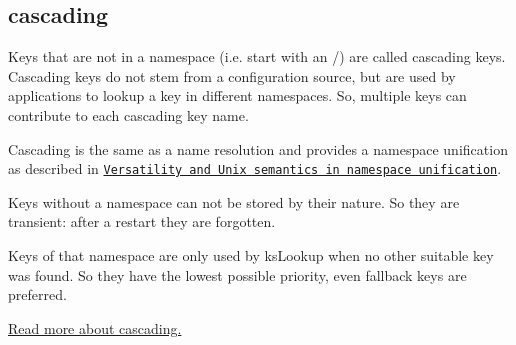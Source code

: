 \subsection*{cascading}

Keys that are not in a namespace (i.\+e. start with an {\ttfamily /}) are called cascading keys. Cascading keys do not stem from a configuration source, but are used by applications to lookup a key in different namespaces. So, multiple keys can contribute to each cascading key name.

Cascading is the same as a name resolution and provides a namespace unification as described in \href{http://dl.acm.org/citation.cfm?id=1138045}{\tt Versatility and Unix semantics in namespace unification}.

Keys without a namespace can not be stored by their nature. So they are transient\+: after a restart they are forgotten.

Keys of that namespace are only used by ks\+Lookup when no other suitable key was found. So they have the lowest possible priority, even fallback keys are preferred.

\hyperlink{md_doc_help_elektra-cascading_doc_help_elektra-cascading_md}{Read more about cascading.} 